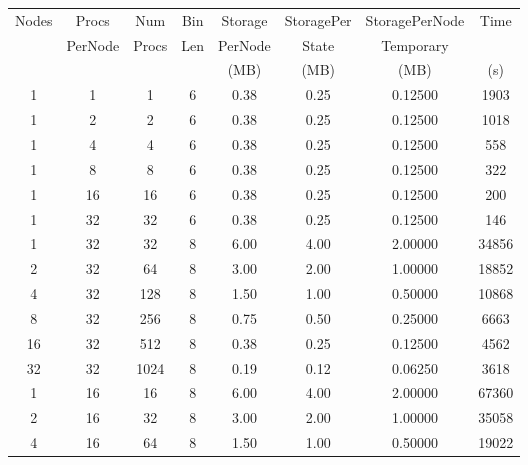 \begin{table}[h!]
\centering
    \begin{tabular}{||c|c|c|c|c|c|c|c||}
        \hline
        Nodes    &  Procs  &    Num   & Bin       &    Storage &    StoragePer   &    StoragePerNode    &    Time    \\
             &   PerNode  &   Procs    &   Len        &    PerNode  &    State     &    Temporary     &       \\
            &      &       &           &     (MB) &     (MB)    &     (MB)    &  (s)     \\         
        \hline
        \hline
         1   &   1   &   1   &   6   &     0.38    &   0.25    &   0.12500 &   1903    \\
         1   &   2   &   2   &   6   &     0.38    &   0.25    &   0.12500 &   1018    \\
         1   &   4   &   4   &   6   &     0.38    &   0.25    &   0.12500 &   558 \\
         1   &   8   &   8   &   6   &     0.38    &   0.25    &   0.12500 &   322 \\
         1   &   16  &   16  &   6   &     0.38    &   0.25    &   0.12500 &   200 \\
         1   &   32  &   32  &   6   &     0.38    &   0.25    &   0.12500 &   146 \\
         \hline
         1   &   32  &   32  &   8   &     6.00    &   4.00    &   2.00000 &   34856   \\
         2   &   32  &   64  &   8   &     3.00    &   2.00    &   1.00000 &   18852   \\
         4   &   32  &   128 &   8   &     1.50    &   1.00    &   0.50000 &   10868   \\
         8   &   32  &   256 &   8   &     0.75    &   0.50    &   0.25000 &   6663    \\
         16  &   32  &   512 &   8   &     0.38    &   0.25    &   0.12500 &   4562    \\
         32  &   32  &   1024    &   8   &     0.19    &   0.12    &   0.06250 &   3618    \\
         \hline
         1   &   16  &   16  &   8   &     6.00    &   4.00    &   2.00000 &   67360   \\
         2   &   16  &   32  &   8   &     3.00    &   2.00    &   1.00000 &   35058   \\
         4   &   16  &   64  &   8   &     1.50    &   1.00    &   0.50000 &   19022   \\

\end{tabular}
\end{table}
